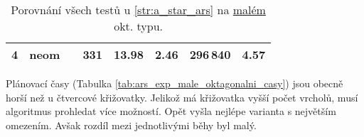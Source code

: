 \begin{table}[b!]
\begin{tabular}{c c c r D{.}{,}{2.2}D{.}{,}{1.2} r D{.}{,}{1.2}}
		4 & neom & \mc{---} & 331          & 13.98                                & 2.46 & 296\,840          & 4.57                                \\
		\bottomrule
	\end{tabular}
	\caption{Porovnání všech testů u \ref{str:a_star_ars} na \hyperref[par:data_mala]{malém} okt. typu.}\label{tab:ars_exp_male_oktagonalni}
\end{table}

Plánovací časy (Tabulka \ref{tab:ars_exp_male_oktagonalni_casy}) jsou obecně horší než u čtvercové křižovatky.
Jelikož má křižovatka vyšší počet vrcholů, musí algoritmus prohledat více možností.
Opět vyšla nejlépe varianta s největším omezením.
Avšak rozdíl mezi jednotlivými běhy byl malý.

